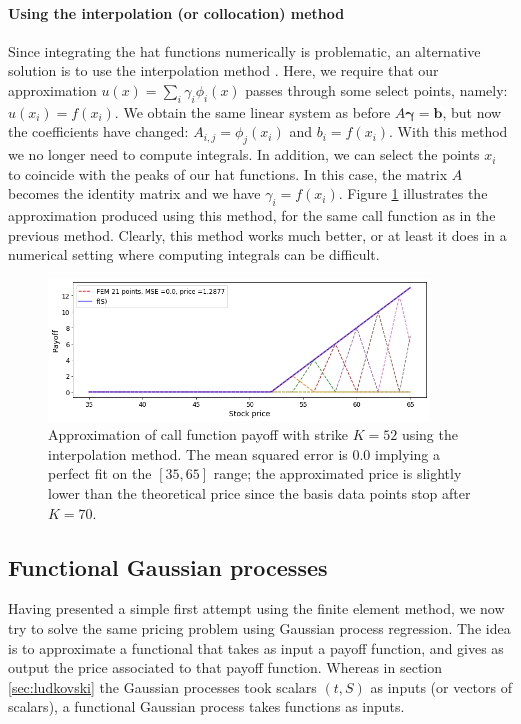 \documentclass[a4paper,12pt]{article}
\begin{document}
\paragraph{Using the interpolation (or collocation) method}
Since integrating the hat functions numerically is problematic, an alternative solution is to use the interpolation method \cite{fem_paper}. Here, we require that our approximation $u(x) = \sum_i \gamma_i \phi_i(x)$ passes through some select points, namely: $u(x_i) = f(x_i)$. We obtain the same linear system as before $A\boldsymbol{\gamma} = \mathbf{b}$, but now the coefficients have changed: $A_{i,j} = \phi_j(x_i)$ and $b_i = f(x_i)$. With this method we no longer need to compute integrals. In addition, we can select the points $x_i$ to coincide with the peaks of our hat functions. In this case, the matrix $A$ becomes the identity matrix and we have $\gamma_i = f(x_i)$. Figure \ref{fig:fem_interpolation} illustrates the approximation produced using this method, for the same call function as in the previous method. Clearly, this method works much better, or at least it does in a numerical setting where computing integrals can be difficult.
\begin{figure} [H]
    \centering
    \includegraphics[width=0.9\textwidth]{fem_interpolation_C52.png}
    \caption{Approximation of call function payoff with strike $K=52$ using the interpolation method. The mean squared error is 0.0 implying a perfect fit on the $[35,65]$ range; the approximated price is slightly lower than the theoretical price since the basis data points stop after $K=70$.}
    \label{fig:fem_interpolation}
\end{figure}

\subsection{Functional Gaussian processes}
Having presented a simple first attempt using the finite element method, we now try to solve the same pricing problem using Gaussian process regression. The idea is to approximate a functional that takes as input a payoff function, and gives as output the price associated to that payoff function. Whereas in section \ref{sec:ludkovski} the Gaussian processes took scalars $(t, S)$ as inputs (or vectors of scalars), a functional Gaussian process takes functions as inputs.
\end{document}
